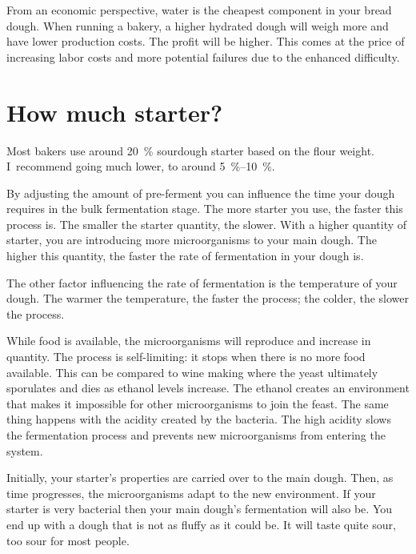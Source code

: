 From an economic perspective, water is the cheapest component in your bread
dough. When running a bakery, a higher hydrated dough will weigh more and have
lower production costs. The profit will be higher. This comes at the price
of increasing labor costs and more potential failures due to the enhanced
difficulty.

\section{How much starter?}

Most bakers use around \qty{20}{\percent} sourdough starter based on the
flour weight.  I~recommend going much lower, to around
\qtyrange{5}{10}{\percent}.

By adjusting the amount of pre-ferment you can influence the time your dough
requires in the bulk fermentation stage. The more starter you use, the faster
this process is. The smaller the starter quantity, the slower. With a higher
quantity of starter, you are introducing more microorganisms to your main
dough. The higher this quantity, the faster the rate of fermentation in your
dough is.

The other factor influencing the rate of fermentation is the temperature of
your dough. The warmer the temperature, the faster the process; the colder, the
slower the process.

While food is available, the microorganisms will reproduce and increase in
quantity. The process is self-limiting: it stops when there is no
more food available. This can be compared to wine making where
the yeast ultimately sporulates and dies as ethanol levels increase. The ethanol creates an
environment that makes it impossible for other
microorganisms to join the feast. The same thing happens with the acidity
created by the bacteria. The high acidity slows the fermentation process and
prevents new microorganisms from entering the system.

Initially, your starter's properties are carried over to the main dough. Then,
as time progresses, the microorganisms adapt to the new environment. If your
starter is very bacterial then your main dough's fermentation will also be. You
end up with a dough that is not as fluffy as it could be. It will taste quite
sour, too sour for most people.

